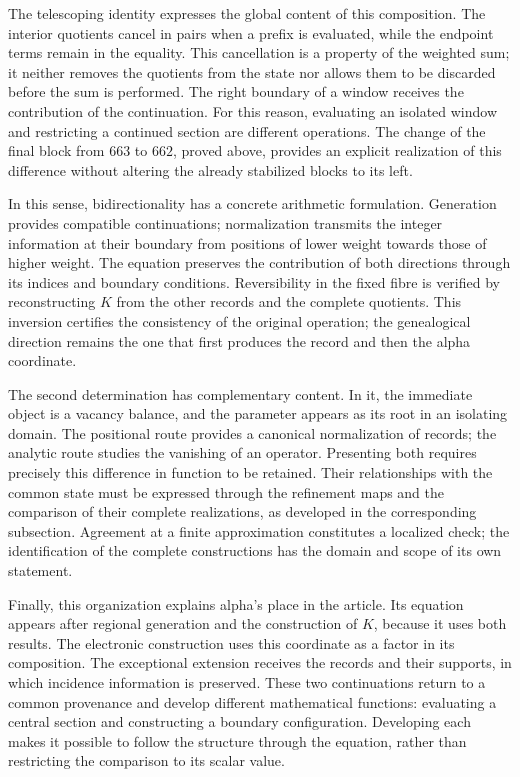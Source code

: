 The telescoping identity expresses the global content of this composition.
The interior quotients cancel in pairs when a prefix is evaluated,
while the endpoint terms remain in the equality. This cancellation is
a property of the weighted sum; it neither removes the quotients from the state nor
allows them to be discarded before the sum is performed. The right boundary of a
window receives the contribution of the continuation. For this reason,
evaluating an isolated window and restricting a continued section
are different operations. The change of the final block from $663$ to
$662$, proved above, provides an explicit realization of this
difference without altering the already stabilized blocks to its left.

In this sense, bidirectionality has a concrete arithmetic
formulation. Generation provides compatible continuations;
normalization transmits the integer information at their boundary from
positions of lower weight towards those of higher weight. The equation preserves the
contribution of both directions through its indices and boundary
conditions. Reversibility in the fixed fibre is verified by reconstructing
$K$ from the other records and the complete quotients. This
inversion certifies the consistency of the original operation; the genealogical
direction remains the one that first produces the record and then
the alpha coordinate.

The second determination has complementary content. In it, the
immediate object is a vacancy balance, and the parameter appears as
its root in an isolating domain. The positional route provides a
canonical normalization of records; the analytic route studies the vanishing
of an operator. Presenting both requires precisely this difference
in function to be retained. Their relationships with the common state must
be expressed through the refinement maps and the comparison of
their complete realizations, as developed in the corresponding
subsection. Agreement at a finite approximation constitutes a
localized check; the identification of the complete constructions
has the domain and scope of its own statement.

Finally, this organization explains alpha's place in the article.
Its equation appears after regional generation and the construction
of $K$, because it uses both results. The electronic construction
uses this coordinate as a factor in its composition. The exceptional
extension receives the records and their supports, in which incidence
information is preserved. These two continuations return to a common
provenance and develop different mathematical functions: evaluating a
central section and constructing a boundary configuration.
Developing each makes it possible to follow the structure through the
equation, rather than restricting the comparison to its scalar value.
